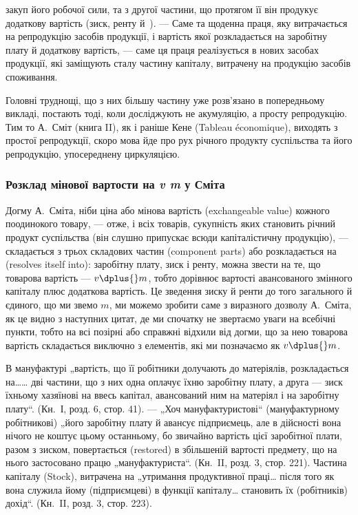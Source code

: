 \parcont{}  %
закуп його робочої сили, та з другої частини, що протягом її він продукує
додаткову вартість (зиск, ренту й~). — Саме та щоденна праця,
яку витрачається на репродукцію засобів продукції, і вартість якої
розкладається на заробітну плату й додаткову вартість, — саме ця праця
реалізується в нових засобах продукції, які заміщують сталу частину
капіталу, витрачену на продукцію засобів споживання.

Головні труднощі, що з них більшу частину уже розв’язано в попередньому
викладі, постають тоді, коли досліджують не акумуляцію, а просту
репродукцію. Тим то А.~Сміт (книга II), як і раніше Кене (Tableau
économique), виходять з простої репродукції, скоро мова йде про рух
річного продукту суспільства та його репродукцію, упосереднену циркуляцією.

\subsubsection[]{Розклад мінової вартости на \emph{v \dplus{} m} у Сміта}

Догму А.~Сміта, ніби ціна або мінова вартість (exchangeable value)
кожного поодинокого товару, — отже, і всіх товарів, сукупність яких
становить річний продукт суспільства (він слушно припускає всюди капіталістичну
продукцію), — складається з трьох складових частин (component
parts) або розкладається на (resolves itself into): заробітну плату,
зиск і ренту, можна звести на те, що товарова вартість — $v \dplus{} m$, тобто
дорівнює вартості авансованого змінного капіталу плюс додаткова вартість.
Це зведення зиску й ренти до того загального й єдиного, що
ми звемо $m$, ми можемо зробити саме з виразного дозволу А.~Сміта, як
це видно з наступних цитат, де ми спочатку не звертаємо уваги на всебічні
пункти, тобто на всі позірні або справжні відхили від догми, що за
нею товарова вартість складається виключно з елементів, які ми позначаємо
як $v \dplus{} m$.

В мануфактурі „вартість, що її робітники долучають до матеріялів,
розкладається на\dots{}\dots{} дві частини, що з них одна оплачує їхню заробітну
плату, а друга — зиск їхньому хазяїнові на ввесь капітал, авансований ним
на матеріял і на заробітну плату“. (Кн.~І, розд. 6, стор. 41). — „Хоч
мануфактуристові“ (мануфактурному робітникові) „його заробітну плату
й авансує підприємець, але в дійсності вона нічого не коштує цьому
останньому, бо звичайно вартість цієї заробітної плати, разом з зиском,
повертається (restored) в збільшеній вартості предмету, що на нього застосовано
працю „мануфактуриста“. (Кн.~II, розд. 3, стор. 221). Частина капіталу
(Stock), витрачена на „утримання продуктивної праці\dots{} після того як вона
служила йому (підприємцеві) в функції капіталу\dots{} становить їх (робітників)
дохід“. (Кн.~II, розд. 3, стор. 223).

